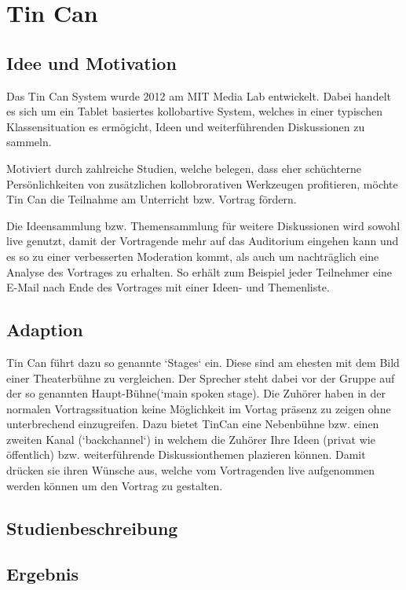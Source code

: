 \section{Tin Can}


\subsection{Idee und Motivation}
Das Tin Can System\cite{HarGorSch2012} wurde 2012 am MIT Media Lab entwickelt. 
Dabei handelt es sich um ein Tablet basiertes kollobartive System,
welches in einer typischen Klassensituation es ermögicht, Ideen und 
weiterführenden Diskussionen zu sammeln.

Motiviert durch zahlreiche Studien, welche belegen, dass eher schüchterne 
Persönlichkeiten von zusätzlichen kollobrorativen Werkzeugen profitieren, 
möchte Tin Can die Teilnahme am Unterricht bzw. Vortrag fördern.

Die Ideensammlung bzw. Themensammlung für weitere Diskussionen wird sowohl live 
genutzt, damit der Vortragende mehr auf das Auditorium eingehen kann und es 
so zu einer verbesserten Moderation kommt, als auch um nach\-träglich eine Analyse 
des Vortrages zu erhalten. So erhält zum Beispiel jeder Teilnehmer eine E-Mail
nach Ende des Vortrages mit einer Ideen- und Themenliste.

\subsection{Adaption}
Tin Can führt dazu so genannte `Stages` ein. Diese sind am ehesten mit dem Bild 
einer Theaterbühne zu vergleichen. Der Sprecher steht dabei vor der Gruppe auf der 
so genannten Haupt-Bühne(`main spoken stage). Die Zuhörer haben in der normalen
Vortragssituation keine Möglichkeit im Vortag präsenz zu zeigen ohne unterbrechend 
einzugreifen. Dazu bietet TinCan eine Nebenbühne bzw. einen zweiten Kanal (`backchannel`) in welchem
die Zuhörer Ihre Ideen (privat wie öffentlich) bzw. wei\-ter\-führ\-en\-de 
Dis\-kus\-sion\-themen plazieren können. Damit drücken sie ihren Wünsche aus, welche vom Vortragenden 
live aufgenommen werden können um den Vortrag zu gestalten.

\subsection{Studienbeschreibung}


\subsection{Ergebnis}

